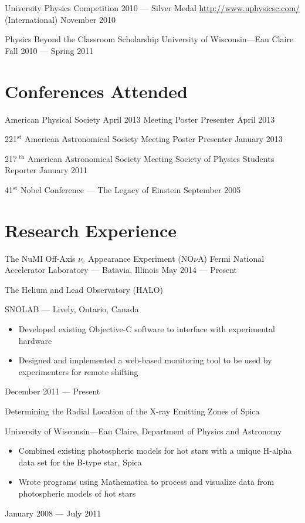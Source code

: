 \documentclass{cv}
\begin{document}
\begin{resume}
\object
{University Physics Competition 2010 --- Silver Medal}
{\href{http://www.uphysicsc.com/}{http://www.uphysicsc.com/} (International)}
{November 2010}


\object
{Physics Beyond the Classroom Scholarship}
{University of Wisconsin---Eau Claire}
{Fall 2010 --- Spring 2011}



\section{Conferences Attended}



\object
{American Physical Society April 2013 Meeting}
{Poster Presenter}
{April 2013}


\object
{221$^\text{st}$ American Astronomical Society Meeting}
{Poster Presenter}
{January 2013}


\object
{217$^\text{ th}$ American Astronomical Society Meeting}
{Society of Physics Students Reporter}
{January 2011}


\object
{41$^\text{st}$ Nobel Conference --- The Legacy of Einstein}
{}
{September 2005}



\newpage

\section{Research Experience}

\object
{The NuMI Off-Axis $\nu_e$ Appearance Experiment (NO$\nu$A)}
{Fermi National Accelerator Laboratory --- Batavia, Illinois \noemph}
{May 2014 --- Present}

\object
{The Helium and Lead Observatory (HALO)}
{SNOLAB --- Lively, Ontario, Canada \noemph
	\begin{itemize}
		\item Developed existing Objective-C software to interface with experimental hardware
		\item Designed and implemented a web-based monitoring tool to be used by experimenters for remote shifting
	\end{itemize}
 }
{December 2011 --- Present}


\objectLarge
{Determining the Radial Location of the X-ray Emitting}
{Zones of Spica}
{University of Wisconsin---Eau Claire, Department of Physics and Astronomy \noemph
\begin{itemize}
		\item Combined existing photospheric models for hot stars with a unique H-alpha data set for the B-type star, Spica
		\item Wrote programs using Mathematica to process and visualize data from photospheric models of hot stars
	\end{itemize}
 }
{January 2008 --- July 2011}



\end{resume}
\end{document}
